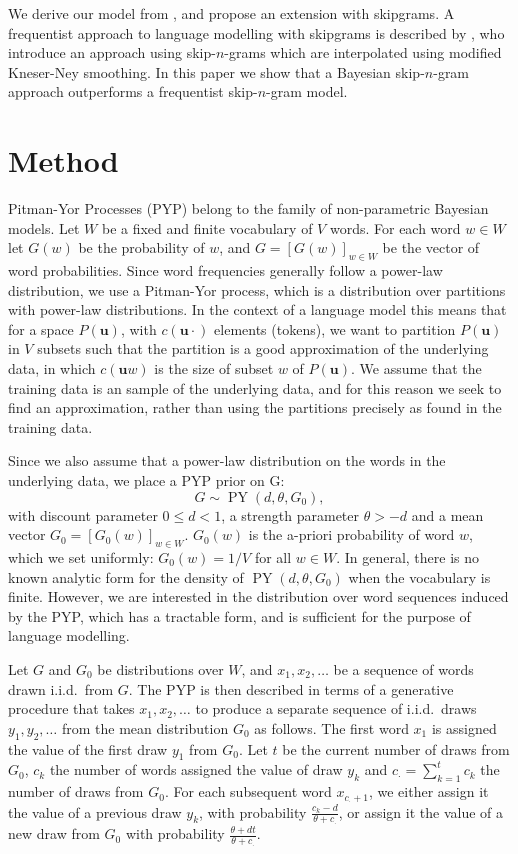   We derive our model from \textcite{teh2006hierarchical}, and propose an extension with skipgrams. A frequentist approach to language modelling with skipgrams is described by \textcite{pickhardt2014generalized}, who introduce an approach using skip-$n$-grams which are interpolated using modified Kneser-Ney smoothing. In this paper we show that a Bayesian skip-$n$-gram approach outperforms a frequentist skip-$n$-gram model.%

\section{Method}

Pitman-Yor Processes (PYP) belong to the family of non-parametric Bayesian models. Let $W$ be a fixed and finite vocabulary of $V$ words. For each word $w\in W$ let $G(w)$ be the probability of $w$, and $G = [G(w)]_{w\in W}$ be the vector of word probabilities. Since word frequencies generally follow a power-law distribution, we use a Pitman-Yor process, which is a distribution over partitions with power-law distributions. 
In the context of a language model this means that for a space $P(\mathbf{u})$, with $c(\mathbf{u}\cdot)$ elements (tokens), we want to partition $P(\mathbf{u})$ in $V$ subsets such that the partition is a good approximation of the underlying data, in which $c(\mathbf{u}w)$ is the size of subset $w$ of $P(\mathbf{u})$. We assume that the training data is an sample of the underlying data, and for this reason we seek to find an approximation, rather than using the partitions precisely as found in the training data.

Since we also assume that a power-law distribution on the words in the underlying data, we place a PYP prior on G:
  \begin{equation*}
  	G \sim \operatorname{PY}(d,\theta,G_0),
  \end{equation*}
with discount parameter $0\leq d<1$, a strength parameter $\theta > -d$ and a mean vector $G_0 = [G_0(w)]_{w\in W}$. $G_0(w)$ is the a-priori probability of word $w$, which we set uniformly: $G_0(w) = 1/V$ for all $w\in W$. In general, there is no known analytic form for the density of $\operatorname{PY}(d,\theta,G_0)$ when the vocabulary is finite. However, we are interested in the distribution over word sequences induced by the PYP, which has a tractable form, and is sufficient for the purpose of language modelling. 

  Let $G$ and $G_0$ be distributions over $W$, and $x_1,x_2,\ldots$ be a sequence of words drawn i.i.d.\ from $G$. The PYP is then described in terms of a generative procedure that takes  $x_1,x_2,\ldots$ to produce a separate sequence of i.i.d.\ draws $y_1,y_2,\ldots$ from the mean distribution $G_0$ as follows. The first word $x_1$ is assigned the value of the first draw $y_1$ from $G_0$. Let $t$ be the current number of draws from $G_0$, $c_k$ the number of words assigned the value of draw $y_k$ and $c_\cdot = \sum^t_{k=1}c_k$ the number of draws from $G_0$. For each subsequent word $x_{c_\cdot+1}$, we either assign it the value of a previous draw $y_k$, with probability $\frac{c_k-d}{\theta+c_\cdot}$, or assign it the value of a new draw from $G_0$ with probability $\frac{\theta+dt}{\theta+c_\cdot}$.

